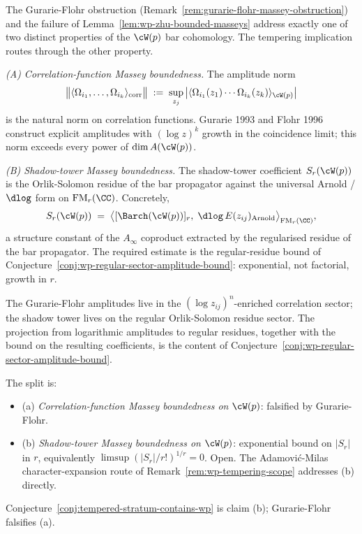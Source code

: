 \begin{remark}
\label{rem:correlation-vs-shadow-massey}
The Gurarie-Flohr obstruction
(Remark~\ref{rem:gurarie-flohr-massey-obstruction}) and the failure of
Lemma~\ref{lem:wp-zhu-bounded-masseys} address exactly one of two
distinct properties of the $\cW(p)$ bar cohomology. The tempering
implication routes through the other property.

\emph{(A) Correlation-function Massey boundedness.} The amplitude norm
\[
 \bigl\| \langle \Omega_{i_1}, \ldots, \Omega_{i_k}\rangle_{\mathrm{corr}}
 \bigr\|
 \;:=\;
 \sup_{z_j}\,
 \bigl\lvert
 \langle \Omega_{i_1}(z_1) \cdots \Omega_{i_k}(z_k)\rangle_{\cW(p)}
 \bigr\rvert
\]
is the natural norm on correlation functions. Gurarie 1993 and
Flohr 1996 construct explicit amplitudes with $(\log z)^k$ growth in
the coincidence limit; this norm exceeds every power of
$\dim A(\cW(p))$.

\emph{(B) Shadow-tower Massey boundedness.} The shadow-tower
coefficient $S_r(\cW(p))$ is the Orlik-Solomon residue of the bar
propagator against the universal Arnold / $\dlog$ form on
$\mathrm{FM}_r(\CC)$. Concretely,
\[
 S_r(\cW(p))
 \;=\;
 \bigl\langle [\Barch(\cW(p))]_r,\;
 \dlog\, E(z_{ij})_{\mathrm{Arnold}}
 \bigr\rangle_{\mathrm{FM}_r(\CC)},
\]
a structure constant of the $A_\infty$ coproduct extracted by the
regularised residue of the bar propagator. The required estimate is
the regular-residue bound of
Conjecture~\ref{conj:wp-regular-sector-amplitude-bound}: exponential,
not factorial, growth in $r$.

The Gurarie-Flohr amplitudes live in the $(\log z_{ij})^n$-enriched
correlation sector; the shadow tower lives on the regular
Orlik-Solomon residue sector. The projection from logarithmic
amplitudes to regular residues, together with the bound on the
resulting coefficients, is the content of
Conjecture~\ref{conj:wp-regular-sector-amplitude-bound}.

The split is:
\begin{itemize}[nosep]
\item (a) \emph{Correlation-function Massey boundedness on $\cW(p)$}:
 falsified by Gurarie-Flohr.
\item (b) \emph{Shadow-tower Massey boundedness on $\cW(p)$}:
 exponential bound on $|S_r|$ in $r$, equivalently
 $\limsup (|S_r|/r!)^{1/r} = 0$. Open. The
 Adamovi\'c-Milas character-expansion route of
 Remark~\ref{rem:wp-tempering-scope} addresses (b) directly.
\end{itemize}
Conjecture~\ref{conj:tempered-stratum-contains-wp} is claim (b);
Gurarie-Flohr falsifies (a).
\end{remark}

